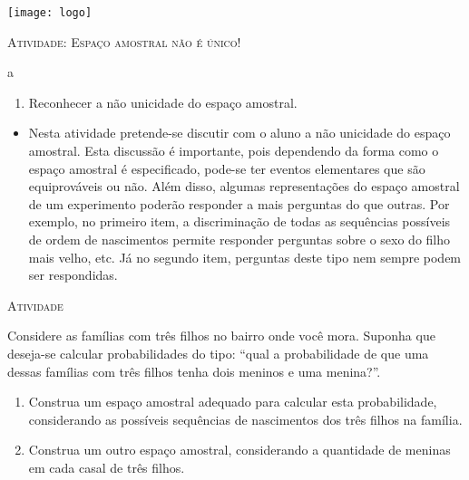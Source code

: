 \documentclass[10 pt,usenames,dvipsnames, oneside]{article}
\begin{document}
\begin{center}
  \begin{minipage}[l]{3cm}
\texttt{[image: logo]}    
\end{minipage}\hfill
\begin{minipage}[r]{.8\textwidth}
 {\Large \scshape Atividade: Espaço amostral não é único!}  
\end{minipage}
\end{center}
\vspace{.2cm}

\ifdefined\prof
\begin{objetivos}
\item a
\end{objetivos}

\begin{goals}
\begin{enumerate}
\item Reconhecer a não unicidade do espaço amostral.
\end{enumerate}

\tcblower

\begin{itemize}
\item Nesta atividade pretende-se discutir com o aluno a não unicidade do espaço amostral. Esta discussão é importante, pois dependendo da forma como o espaço amostral é especificado, pode-se ter eventos elementares que são equiprováveis ou não. Além disso, algumas representações do espaço amostral de um experimento poderão responder a mais perguntas do que outras. Por exemplo, no primeiro item, a discriminação de todas as sequências possíveis de ordem de nascimentos permite responder perguntas sobre o sexo do filho mais velho, etc. Já no segundo item, perguntas deste tipo nem sempre podem ser respondidas.
\end{itemize}
\end{goals}

\bigskip
\begin{center}
{\large \scshape Atividade}
\end{center}
\fi

Considere as famílias com três filhos no bairro onde você mora. Suponha que deseja-se calcular probabilidades do tipo: “qual a probabilidade de que uma dessas famílias com três filhos tenha dois meninos e uma menina?”.
\begin{enumerate}
\item {} 
Construa um espaço amostral adequado para calcular esta probabilidade, considerando as possíveis sequências de nascimentos dos três filhos na família.

\item {} 
Construa um outro espaço amostral, considerando a quantidade de meninas em cada casal de três filhos.

\end{enumerate}
\end{document}
